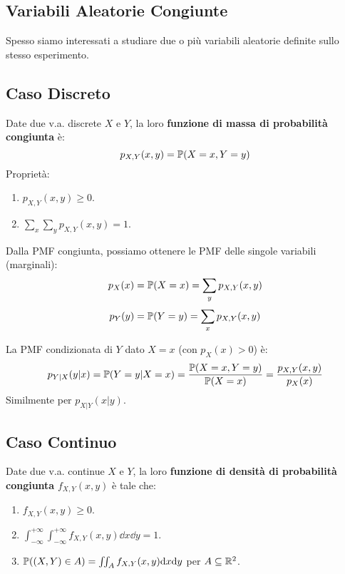 \documentclass[12pt,a4paper]{article}
\begin{document}
\begin{example}
\chapter{Variabili Aleatorie Congiunte}
\label{cap:va_congiunte}
Spesso siamo interessati a studiare due o più variabili aleatorie definite sullo stesso esperimento.

\section{Caso Discreto}
\begin{definition}
Date due v.a. discrete $X$ e $Y$, la loro \textbf{funzione di massa di probabilità congiunta} è:
\[ p_{X,Y}(x,y) = \mathbb{P}(X=x, Y=y) \]
Proprietà:
\begin{enumerate}
    \item $p_{X,Y}(x,y) \ge 0$.
    \item $\sum_x \sum_y p_{X,Y}(x,y) = 1$.
\end{enumerate}
\end{definition}

\begin{definition}
Dalla PMF congiunta, possiamo ottenere le PMF delle singole variabili (marginali):
\[ p_X(x) = \mathbb{P}(X=x) = \sum_y p_{X,Y}(x,y) \]
\[ p_Y(y) = \mathbb{P}(Y=y) = \sum_x p_{X,Y}(x,y) \]
\end{definition}

\begin{definition}
La PMF condizionata di $Y$ dato $X=x$ (con $p_X(x)>0$) è:
\[ p_{Y|X}(y|x) = \mathbb{P}(Y=y|X=x) = \frac{\mathbb{P}(X=x, Y=y)}{\mathbb{P}(X=x)} = \frac{p_{X,Y}(x,y)}{p_X(x)} \]
Similmente per $p_{X|Y}(x|y)$.
\end{definition}

\section{Caso Continuo}
\begin{definition}
Date due v.a. continue $X$ e $Y$, la loro \textbf{funzione di densità di probabilità congiunta} $f_{X,Y}(x,y)$ è tale che:
\begin{enumerate}
    \item $f_{X,Y}(x,y) \ge 0$.
    \item $\int_{-\infty}^{+\infty} \int_{-\infty}^{+\infty} f_{X,Y}(x,y) \dd x \dd y = 1$.
    \item $\mathbb{P}((X,Y) \in A) = \iint_A f_{X,Y}(x,y) \mathrm{d} x \mathrm{d} y$ per $A \subseteq \mathbb{R}^2$.
\end{enumerate}
\end{definition}


\end{example}
\end{document}
